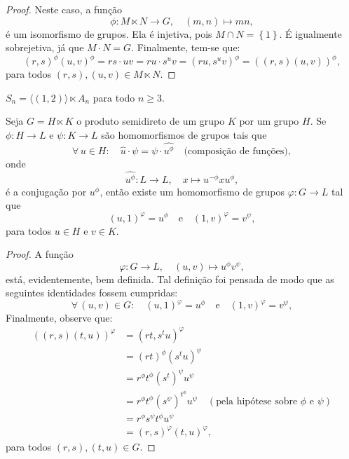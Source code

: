 \begin{proof}
  Neste caso, a função
  \[
    \phi:M\ltimes{N}\to{G},\quad{(m,n)\mapsto{mn}},
  \]
  é um isomorfismo de grupos. Ela é injetiva, pois $M\cap{N}=\left\{1\right\}$. É igualmente sobrejetiva, já que $M\cdot{N}=G$. Finalmente, tem-se que:
  \[
    (r,s)^{\phi}(u,v)^{\phi}=rs\cdot{uv}=ru\cdot{s^{u}v}=(ru,s^{u}v)^{\phi}=\left((r,s)(u,v)\right)^{\phi},
  \]
  para todos $(r,s),(u,v)\in{M\ltimes{N}}$.
\end{proof}

\begin{example}
  $S_{n}=\langle{(1,2)}\rangle\ltimes{A_{n}}$ para todo $n\geqslant{3}$.
\end{example}

\begin{proposition}
  Seja $G=H\ltimes{K}$ o produto semidireto de um grupo $K$ por um grupo $H$. Se $\phi:H\to{L}$ e $\psi:K\to{L}$ são homomorfismos de grupos tais que
  \[
    \forall\,u\in{H}:\quad{\widehat{u}\cdot\psi=\psi\cdot\widehat{u^{\phi}}}\quad\text{(composição de funções)},
  \]
  onde
  \[
    \widehat{u^{\phi}}:L\to{L},\quad{x\mapsto{u^{-\phi}xu^{\phi}}},
  \]
  é a conjugação por $u^{\phi}$, então existe um homomorfismo de grupos $\varphi:G\to{L}$ tal que
  \[
    (u,1)^{\varphi}=u^{\phi}
    \quad\text{e}\quad
    (1,v)^{\varphi}=v^{\psi},
  \]
  para todos $u\in{H}$ e $v\in{K}$.
\end{proposition}

\begin{proof}
  A função
  \[
    \varphi:G\to{L},\quad{(u,v)\mapsto{u^{\phi}v^{\psi}}},
  \]
  está, evidentemente, bem definida. Tal definição foi pensada de modo que as seguintes identidades fossem cumpridas:
  \[
    \forall\,(u,v)\in{G}:
    \quad
    (u,1)^{\varphi}=u^{\phi}
    \quad\text{e}\quad
    (1,v)^{\varphi}=v^{\psi},
  \]
  Finalmente, observe que:
  \begin{align*}
    \left((r,s)(t,u)\right)^{\varphi}
    &=(rt,s^{t}u)^{\varphi}                                                                             \\
    &=(rt)^{\phi}(s^{t}u)^{\psi}                                                                        \\
    &=r^{\phi}t^{\phi}(s^{t})^{\psi}u^{\psi}                                                            \\
    &=r^{\phi}t^{\phi}(s^{\psi})^{t^{\phi}}u^{\psi}\quad(\text{pela hipótese sobre }\phi\text{ e }\psi) \\
    &=r^{\phi}s^{\psi}t^{\phi}u^{\psi}                                                                  \\
    &=(r,s)^{\varphi}(t,u)^{\varphi},
  \end{align*}
  para todos $(r,s),(t,u)\in{G}$.
\end{proof}
